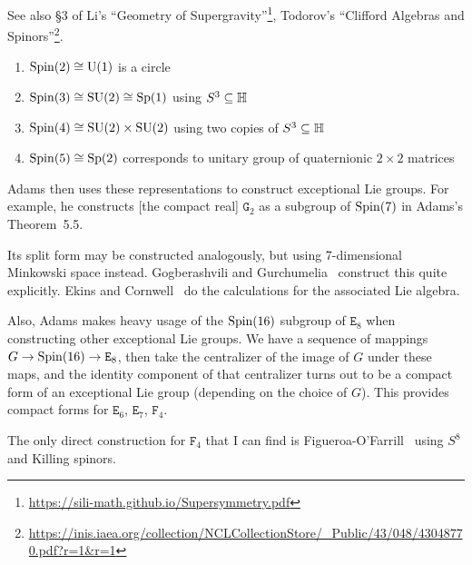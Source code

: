 See also \S3 of Li's ``Geometry of Supergravity''\footnote{\url{https://sili-math.github.io/Supersymmetry.pdf}},
Todorov's ``Clifford Algebras and Spinors''\footnote{\url{https://inis.iaea.org/collection/NCLCollectionStore/_Public/43/048/43048770.pdf?r=1&r=1}}.


\begin{example}
\begin{enumerate}
\item $\operatorname{Spin}(2)\cong\operatorname{U}(1)$ is a circle
\item $\operatorname{Spin}(3)\cong\operatorname{SU}(2)\cong\operatorname{Sp}(1)$ using $S^{3}\subseteq\mathbb{H}$
\item $\operatorname{Spin}(4)\cong\operatorname{SU}(2)\times\operatorname{SU}(2)$ using two copies of $S^{3}\subseteq\mathbb{H}$
\item $\operatorname{Spin}(5)\cong\operatorname{Sp}(2)$ corresponds to unitary group of quaternionic
  $2\times2$ matrices
\end{enumerate}
\end{example}

\M
Adams then uses these representations to construct exceptional Lie
groups. For example, he constructs [the compact real] $\mathtt{G}_{2}$
as a subgroup of $\operatorname{Spin}(7)$ in Adams's Theorem~5.5.

Its split form may be constructed analogously, but using 7-dimensional
Minkowski space instead.
Gogberashvili and Gurchumelia~\cite{Gogberashvili:2019ojg} construct
this quite explicitly. Ekins and Cornwell~\cite{Ekins:1975yu} do the
calculations for the associated Lie algebra.

\M
Also, Adams makes heavy usage of the $\operatorname{Spin}(16)$ subgroup of
$\mathtt{E}_{8}$ when constructing other exceptional Lie groups.
We have a sequence of mappings $G\to\operatorname{Spin}(16)\to\mathtt{E}_{8}$,
then take the centralizer of the image of $G$ under these maps, and the
identity component of that centralizer turns out to be a compact form of
an exceptional Lie group (depending on the choice of $G$).
This provides compact forms for $\mathtt{E}_{6}$, $\mathtt{E}_{7}$,
$\mathtt{F}_{4}$.

The only direct construction for $\mathtt{F}_{4}$
that I can find is Figueroa-O'Farrill~\cite{Figueroa-OFarrill:2007jcv}
using $S^{8}$ and Killing spinors.
